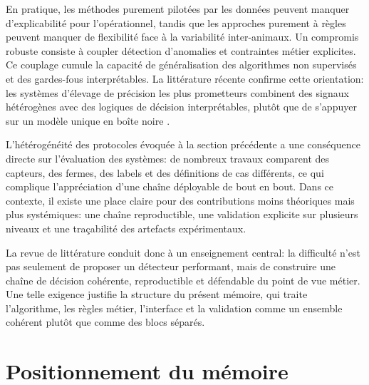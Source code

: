 En pratique, les méthodes purement pilotées par les données peuvent manquer d'explicabilité pour
l'opérationnel, tandis que les approches purement à règles peuvent manquer de flexibilité
face à la variabilité inter-animaux. Un compromis robuste consiste à coupler détection
d'anomalies et contraintes métier explicites. Ce couplage cumule la
capacité de généralisation des algorithmes non supervisés et des gardes-fous
interprétables. La littérature récente confirme cette orientation: les systèmes
d'élevage de précision les plus prometteurs combinent des signaux hétérogènes avec des
logiques de décision interprétables, plutôt que de s'appuyer sur un modèle unique en boîte
noire \citep{palma2025scoping,michelena2025plf_review}.

L'hétérogénéité des protocoles évoquée à la section précédente a une conséquence directe
sur l'évaluation des systèmes: de nombreux travaux comparent des capteurs, des fermes, des
labels et des définitions de cas différents, ce qui complique l'appréciation d'une chaîne
déployable de bout en bout. Dans ce contexte, il existe une place claire pour des
contributions moins théoriques mais plus systémiques: une chaîne reproductible, une
validation explicite sur plusieurs niveaux et une traçabilité des artefacts expérimentaux.

La revue de littérature conduit donc à un enseignement central: la difficulté n'est pas
seulement de proposer un détecteur performant, mais de construire une chaîne de décision
cohérente, reproductible et défendable du point de vue métier. Une telle exigence justifie
la structure du présent mémoire, qui traite l'algorithme, les règles métier, l'interface et
la validation comme un ensemble cohérent plutôt que comme des blocs séparés.

\section{Positionnement du mémoire}

